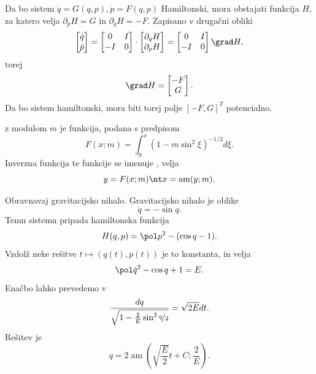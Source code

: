 Da bo sistem $\dot{q} = G(q, p), \dot{p} = F(q, p)$ Hamiltonski, mora obstajati
funkcija $H$, za katero velja $\partial_p H = G$ in $\partial_q H = -F$.
Zapisano v drugačni obliki
\[
  \begin{bmatrix}
	\dot{q} \\ \dot{p}
  \end{bmatrix}
  =
  \begin{bmatrix}
	0 & I \\ -I & 0
  \end{bmatrix}
  \cdot
  \begin{bmatrix}
	\partial_q H \\ \partial_p H
  \end{bmatrix}
  =
  \begin{bmatrix}
	0 & I \\ -I & 0
  \end{bmatrix}
  \grad H,
\]
torej
\[
  \grad H
  =
  \begin{bmatrix}
	-F \\ G
  \end{bmatrix}.
\]
Da bo sistem hamiltonski, mora biti torej polje $[-F, G]^T$ potencialno.


\begin{definicija}
   z modulom $m$ je funkcija, podana s
  predpisom
  \[
	F(x;m) = \int_0^x \left( 1 - m \sin^2 \xi \right)^{-1/2} d\xi.
  \]
  Inverzna funkcija te funkcije se imenuje , velja
  \[
	y = F(x;m) \nt x = \operatorname{am}(y;m).
  \]
\end{definicija}

\begin{vo}{Obravnavaj gravitacijsko nihalo.}
  Gravitacijsko nihalo je oblike
  \[
	\ddot{q} = - \sin q.
  \]
  Temu sistemu pripada hamiltonska funkcija
  \[
	H(q, p) = \pol p^2 - (\cos q - 1).
  \]
  Vzdolž neke rešitve $t \mapsto (q(t), p(t))$ je to konstanta, in velja
  \[
	\pol \dot{q}^2 - \cos q + 1 = E.
  \]
  Enačbo lahko prevedemo v
  \[
	\frac{dq}{\sqrt{1 - \frac{2}{E} \sin^2 \nicefrac{q}{2}}}
	= \sqrt{2E} dt.
  \]
  Rešitev je
  \[
	q = 2 \operatorname{am}\left( \sqrt{\frac{E}{2}} t + C; \frac{2}{E} \right).
  \]
\end{vo}